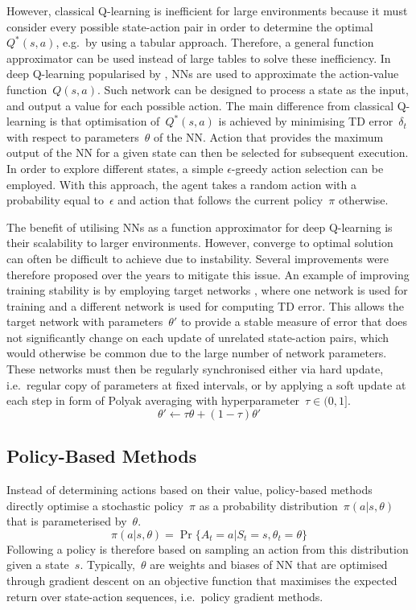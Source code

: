However, classical Q-learning is inefficient for large environments because it must consider every possible state-action pair in order to determine the optimal~\(Q^{*}(s, a)\), e.g.~by using a tabular approach. Therefore, a general function approximator can be used instead of large tables to solve these inefficiency. In deep Q-learning popularised by \citet{mnih_human-level_2015}, NNs are used to approximate the action-value function~\(Q(s, a)\). Such network can be designed to process a state as the input, and output a value for each possible action. The main difference from classical Q-learning is that optimisation of~\(Q^{*}(s, a)\) is achieved by minimising TD error~\(\delta_{t}\) with respect to parameters~\(\theta\) of the NN. Action that provides the maximum output of the NN for a given state can then be selected for subsequent execution. In order to explore different states, a simple \(\epsilon\)-greedy action selection can be employed. With this approach, the agent takes a random action with a probability equal to~\(\epsilon\) and action that follows the current policy~\(\pi\) otherwise.

The benefit of utilising NNs as a function approximator for deep Q-learning is their scalability to larger environments. However, converge to optimal solution can often be difficult to achieve due to instability. Several improvements were therefore proposed over the years to mitigate this issue. An example of improving training stability is by employing target networks \cite{mnih_human-level_2015}, where one network is used for training and a different network is used for computing TD error. This allows the target network with parameters~\(\theta'\) to provide a stable measure of error that does not significantly change on each update of unrelated state-action pairs, which would otherwise be common due to the large number of network parameters. These networks must then be regularly synchronised either via hard update, i.e.~regular copy of parameters at fixed intervals, or by applying a soft update at each step in form of Polyak averaging with hyperparameter~\(\tau \in (0, 1]\).
\begin{equation}
    \theta' \leftarrow \tau \theta + (1-\tau) \theta'
\end{equation}


\subsection{Policy-Based Methods}

Instead of determining actions based on their value, policy-based methods directly optimise a stochastic policy~\(\pi\) as a probability distribution~\(\pi(a \vert s, \theta)\) that is parameterised by~\(\theta\).
\begin{equation}
    \pi(a \vert s, \theta) = \Pr\{A_{t}{=}a \vert S_{t}{=}s, \theta_{t}{=}\theta \}
\end{equation}
Following a policy is therefore based on sampling an action from this distribution given a state~\(s\). Typically,~\(\theta\) are weights and biases of NN that are optimised through gradient descent on an objective function that maximises the expected return over state-action sequences, i.e.~policy gradient methods.

